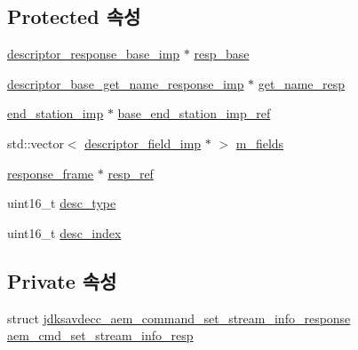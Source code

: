 \subsection*{Protected 속성}
\begin{DoxyCompactItemize}
\item 
\hyperlink{classavdecc__lib_1_1descriptor__response__base__imp}{descriptor\+\_\+response\+\_\+base\+\_\+imp} $\ast$ \hyperlink{classavdecc__lib_1_1descriptor__base__imp_a8b104da8319cda946944548ebb9552f4}{resp\+\_\+base}
\item 
\hyperlink{classavdecc__lib_1_1descriptor__base__get__name__response__imp}{descriptor\+\_\+base\+\_\+get\+\_\+name\+\_\+response\+\_\+imp} $\ast$ \hyperlink{classavdecc__lib_1_1descriptor__base__imp_a7d3a410eb242dc2b7abe9862a1593458}{get\+\_\+name\+\_\+resp}
\item 
\hyperlink{classavdecc__lib_1_1end__station__imp}{end\+\_\+station\+\_\+imp} $\ast$ \hyperlink{classavdecc__lib_1_1descriptor__base__imp_a550c969411f5f3b69f55cc139763d224}{base\+\_\+end\+\_\+station\+\_\+imp\+\_\+ref}
\item 
std\+::vector$<$ \hyperlink{classavdecc__lib_1_1descriptor__field__imp}{descriptor\+\_\+field\+\_\+imp} $\ast$ $>$ \hyperlink{classavdecc__lib_1_1descriptor__base__imp_adce67136eb9c66da9c189b730077b9cd}{m\+\_\+fields}
\item 
\hyperlink{classavdecc__lib_1_1response__frame}{response\+\_\+frame} $\ast$ \hyperlink{classavdecc__lib_1_1descriptor__base__imp_a2642e3a7c10d38553e7ff4a55e875346}{resp\+\_\+ref}
\item 
uint16\+\_\+t \hyperlink{classavdecc__lib_1_1descriptor__base__imp_a9dada313309522d04f1e52fe887442b4}{desc\+\_\+type}
\item 
uint16\+\_\+t \hyperlink{classavdecc__lib_1_1descriptor__base__imp_a2bbd0d8f32f687ca36aaa543c06f764c}{desc\+\_\+index}
\end{DoxyCompactItemize}
\subsection*{Private 속성}
\begin{DoxyCompactItemize}
\item 
struct \hyperlink{structjdksavdecc__aem__command__set__stream__info__response}{jdksavdecc\+\_\+aem\+\_\+command\+\_\+set\+\_\+stream\+\_\+info\+\_\+response} \hyperlink{classavdecc__lib_1_1stream__output__descriptor__imp_aa222e1112a2252bbff62b2eb82d5faad}{aem\+\_\+cmd\+\_\+set\+\_\+stream\+\_\+info\+\_\+resp}
\end{DoxyCompactItemize}


